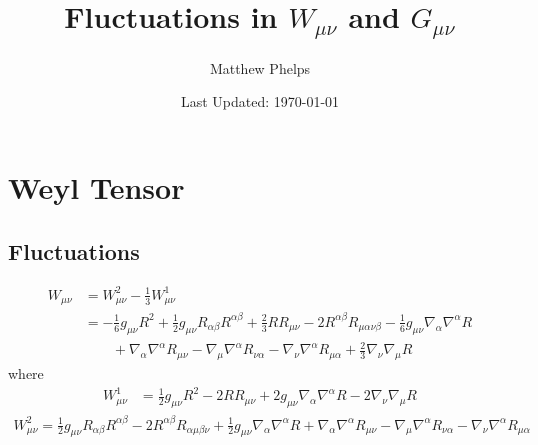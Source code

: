 \documentclass[10pt,letterpaper]{article}
\title{Fluctuations in  $W_{\mu\nu}$ and $G_{\mu\nu}$}
\author{Matthew Phelps}
\date{Last Updated: \today}
\begin{document}
\maketitle
\newpage
\tableofcontents
\newpage
\section{Weyl Tensor}
\subsection{Fluctuations}
\begin{align}
	W_{\mu\nu} &= W^2_{\mu\nu} - \frac13 W^1_{\mu\nu}\\
	&= - \tfrac{1}{6} g_{\mu \nu} R^2 + \tfrac{1}{2} g_{\mu \nu} R_{\alpha \beta} R^{\alpha \beta} + \tfrac{2}{3} R R_{\mu \nu} - 2 R^{\alpha \beta} R_{\mu \alpha \nu \beta} -  \tfrac{1}{6} g_{\mu \nu} \nabla_{\alpha}\nabla^{\alpha}R \\
&\qquad + \nabla_{\alpha}\nabla^{\alpha}R_{\mu \nu} -  \nabla_{\mu}\nabla^{\alpha}R_{\nu \alpha} -  \nabla_{\nu}\nabla^{\alpha}R_{\mu \alpha} + \tfrac{2}{3} \nabla_{\nu}\nabla_{\mu}R
\end{align}
where 
\begin{align}
	W^1_{\mu\nu} &= \tfrac{1}{2} g_{\mu \nu} R^2 - 2 R R_{\mu \nu} + 2 g_{\mu \nu} \nabla_{\alpha}\nabla^{\alpha}R - 2 \nabla_{\nu}\nabla_{\mu}R
\end{align}
\begin{align}
	W^2_{\mu\nu} = \tfrac{1}{2} g_{\mu \nu} R_{\alpha \beta} R^{\alpha \beta} - 2 R^{\alpha \beta} R_{\alpha \mu \beta \nu} + \tfrac{1}{2} g_{\mu \nu} \nabla_{\alpha}\nabla^{\alpha}R + \nabla_{\alpha}\nabla^{\alpha}R_{\mu \nu} -  \nabla_{\mu}\nabla^{\alpha}R_{\nu \alpha} -  \nabla_{\nu}\nabla^{\alpha}R_{\mu \alpha}
\end{align}
\end{document}

